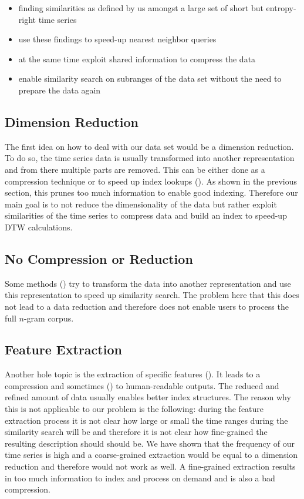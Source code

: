 \begin{itemize}
    \item finding similarities as defined by us amongst a large set of short but entropy-right time series
    \item use these findings to speed-up nearest neighbor queries
    \item at the same time exploit shared information to compress the data
    \item enable similarity search on subranges of the data set without the need to prepare the data again
\end{itemize}


\subsection{Dimension Reduction}
\label{ssec:baseline:prior:dimred}

The first idea on how to deal with our data set would be a dimension reduction. To do so, the time series data is usually transformed into another representation and from there multiple parts are removed. This can be either done as a compression technique or to speed up index lookups (\cite{LB_Keogh,LB_Improved,dimred1,dimred2}). As shown in the previous section, this prunes too much information to enable good indexing. Therefore our main goal is to not reduce the dimensionality of the data but rather exploit similarities of the time series to compress data and build an index to speed-up DTW calculations.


\subsection{No Compression or Reduction}
\label{ssec:baseline:prior:nocompression}

Some methods (\cite{dimred3,dimred4}) try to transform the data into another representation and use this representation to speed up similarity search. The problem here that this does not lead to a data reduction and therefore does not enable users to process the full $n$-gram corpus.


\subsection{Feature Extraction}
\label{ssec:baseline:prior:extract}

Another hole topic is the extraction of specific features (\cite{compress1,compress2,compress3,compress4,compress5}). It leads to a compression and sometimes (\cite{compress1}) to human-readable outputs. The reduced and refined amount of data usually enables better index structures. The reason why this is not applicable to our problem is the following: during the feature extraction process it is not clear how large or small the time ranges during the similarity search will be and therefore it is not clear how fine-grained the resulting description should should be. We have shown that the frequency of our time series is high and a coarse-grained extraction would be equal to a dimension reduction and therefore would not work as well. A fine-grained extraction results in too much information to index and process on demand and is also a bad compression.


